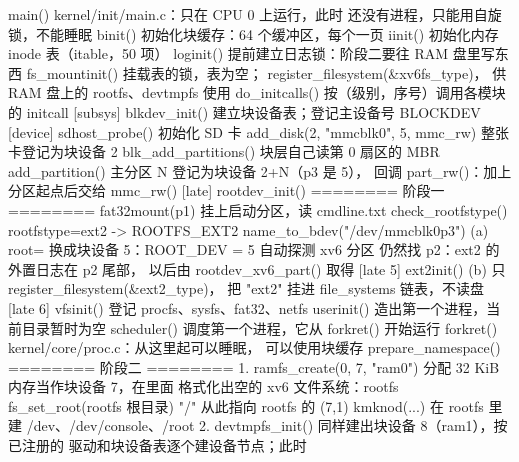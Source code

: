 \begin{txtcode}
main()                                 kernel/init/main.c：只在 CPU 0 上运行，此时
                                       还没有进程，只能用自旋锁，不能睡眠
  binit()                              初始化块缓存：64 个缓冲区，每个一页
  iinit()                              初始化内存 inode 表（itable，50 项）
    loginit()                          提前建立日志锁：阶段二要往 RAM 盘里写东西
    fs_mountinit()                     挂载表的锁，表为空；
                                       register_filesystem(&xv6fs_type)，
                                       供 RAM 盘上的 rootfs、devtmpfs 使用
  do_initcalls()                       按（级别，序号）调用各模块的 initcall
    [subsys] blkdev_init()             建立块设备表；登记主设备号 BLOCKDEV
    [device] sdhost_probe()            初始化 SD 卡
      add_disk(2, "mmcblk0", 5, mmc_rw)
                                       整张卡登记为块设备 2
        blk_add_partitions()           块层自己读第 0 扇区的 MBR
          add_partition()              主分区 N 登记为块设备 2+N（p3 是 5），
                                       回调 part_rw()：加上分区起点后交给 mmc_rw()
    [late]   rootdev_init()            ======== 阶段一 ========
      fat32mount(p1)                   挂上启动分区，读 cmdline.txt   
      check_rootfstype()               rootfstype=ext2 -> ROOTFS_EXT2
      name_to_bdev("/dev/mmcblk0p3")
                                  (a)  root= 换成块设备 5：ROOT_DEV = 5
      自动探测 xv6 分区                仍然找 p2：ext2 的外置日志在 p2 尾部，
                                       以后由 rootdev_xv6_part() 取得
    [late 5] ext2init()           (b)  只 register_filesystem(&ext2_type)，
                                       把 "ext2" 挂进 file_systems 链表，不读盘
    [late 6] vfsinit()                 登记 procfs、sysfs、fat32、netfs
  userinit()                           造出第一个进程，当前目录暂时为空
  scheduler()                          调度第一个进程，它从 forkret() 开始运行
forkret()                              kernel/core/proc.c：从这里起可以睡眠，
                                       可以使用块缓存
  prepare_namespace()                  ======== 阶段二 ========
    1. ramfs_create(0, 7, "ram0")      分配 32 KiB 内存当作块设备 7，在里面
                                       格式化出空的 xv6 文件系统：rootfs
       fs_set_root(rootfs 根目录)      "/" 从此指向 rootfs 的 (7,1)
       kmknod(...)                     在 rootfs 里建 /dev、/dev/console、/root
    2. devtmpfs_init()                 同样建出块设备 8（ram1），按已注册的
                                       驱动和块设备表逐个建设备节点；此时

\end{txtcode}
